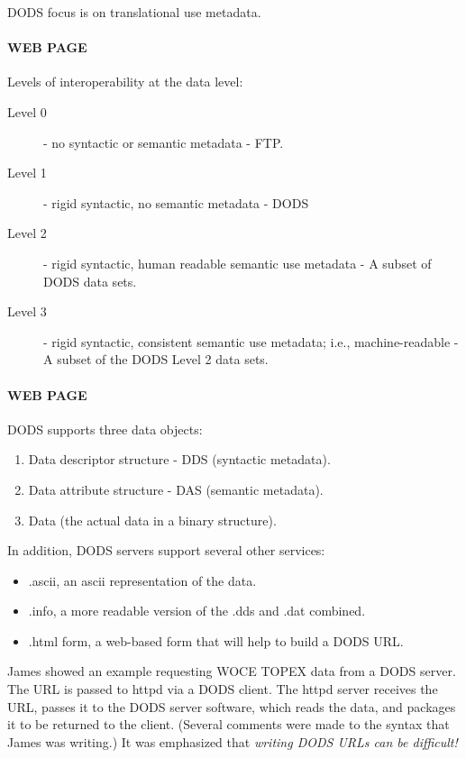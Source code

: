 DODS focus is on translational use metadata.

\paragraph{WEB PAGE}  Levels of interoperability at the data level:
\begin{description}
\item[Level 0] - no syntactic or semantic metadata - FTP.
\item[Level 1] - rigid syntactic, no semantic metadata - DODS
\item[Level 2] - rigid syntactic, human readable semantic use
  metadata - A subset of DODS data sets.
\item[Level 3] - rigid syntactic, consistent semantic use metadata;
  i.e., machine-readable - A subset of the DODS Level 2 data sets.
\end{description}

\paragraph{WEB PAGE}  DODS supports three data objects:
\begin{enumerate}
\item Data descriptor structure - DDS  (syntactic metadata).
\item Data attribute structure  - DAS (semantic metadata).
\item Data (the actual data in a binary structure).
\end{enumerate}

In addition, DODS servers support several other services:
\begin{itemize}
\item .ascii, an ascii representation of the data.
\item .info, a more readable version of the .dds and .dat combined.
\item .html form, a web-based form that will help to build a DODS URL.
\end{itemize}  

James showed an example requesting WOCE TOPEX data from a DODS server.
The URL is passed to httpd via a DODS client.  The httpd server
receives the URL, passes it to the DODS server software, which reads
the data, and packages it to be returned to the client.  (Several
comments were made to the syntax that James was writing.)  It was
emphasized that \emph{writing DODS URLs can be difficult!}


